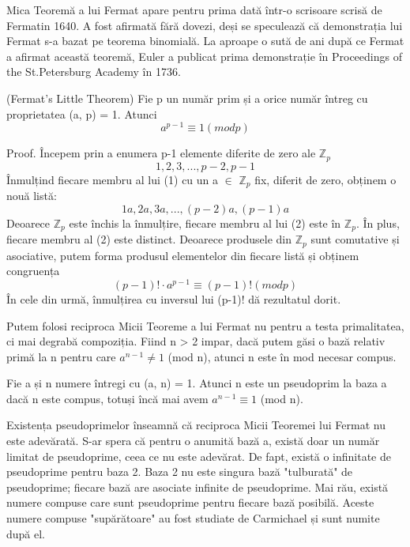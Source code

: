 \documentclass[runningheads]{llncs}
\begin{document}
Mica Teoremă a lui Fermat apare pentru prima dată într-o scrisoare scrisă de Fermatin 1640. A fost afirmată fără dovezi,
deși se speculează că demonstrația lui Fermat s-a bazat pe teorema binomială. La aproape o sută de ani după ce Fermat a
afirmat această teoremă, Euler a publicat prima demonstrație în Proceedings of the St.Petersburg Academy în 1736.

\begin{theorem} (Fermat’s Little Theorem)
    Fie p un număr prim și a orice număr întreg cu proprietatea (a, p) = 1. Atunci
    \begin{equation*}
        a^{p-1} \equiv 1 (mod p)
    \end{equation*}
\end{theorem}

Proof. Începem prin a enumera p-1 elemente diferite de zero ale $\mathbb{Z}{_p}$
    \begin{equation}
        1, 2, 3, ..., p-2, p-1
    \end{equation}
    Înmulțind fiecare membru al lui (1) cu un a $\in$ $\mathbb{Z}{_p}$ fix, diferit de zero, obținem o nouă listă:
    \begin{equation}
        1a, 2a, 3a, ..., (p-2)a, (p-1)a
    \end{equation}
    Deoarece $\mathbb{Z}{_p}$ este închis la înmulțire, fiecare membru al lui (2) este în $\mathbb{Z}{_p}$. În plus, fiecare membru al (2) este distinct.
    Deoarece produsele din $\mathbb{Z}{_p}$ sunt comutative și asociative, putem forma produsul elementelor din fiecare listă și obținem congruența
    \begin{equation*}
        (p-1)! \cdot a^{p-1} \equiv (p-1)! (mod p)
    \end{equation*}
    În cele din urmă, înmulțirea cu inversul lui (p-1)! dă rezultatul dorit.

Putem folosi reciproca Micii Teoreme a lui Fermat nu pentru a testa primalitatea, ci mai degrabă compoziția.
Fiind n > 2 impar, dacă putem găsi o bază relativ primă la n pentru care $a^{n-1} \ne 1$ (mod n), atunci n este în mod necesar compus.

\begin{definition}
    Fie a și n numere întregi cu (a, n) = 1. Atunci n este un pseudoprim la baza a dacă n este compus, totuși încă mai
    avem $a^{n-1} \equiv 1$ (mod n).
\end{definition}

Existența pseudoprimelor înseamnă că reciproca Micii Teoremei lui Fermat nu este adevărată. S-ar spera că pentru o anumită bază a,
există doar un număr limitat de pseudoprime, ceea ce nu este adevărat. De fapt, există o infinitate de pseudoprime pentru baza 2. Baza 2 nu
este singura bază "tulburată" de pseudoprime; fiecare bază are asociate infinite de pseudoprime. Mai rău, există numere compuse
care sunt pseudoprime pentru fiecare bază posibilă. Aceste numere compuse "supărătoare" au fost studiate de Carmichael și sunt numite după el.
\end{document}
